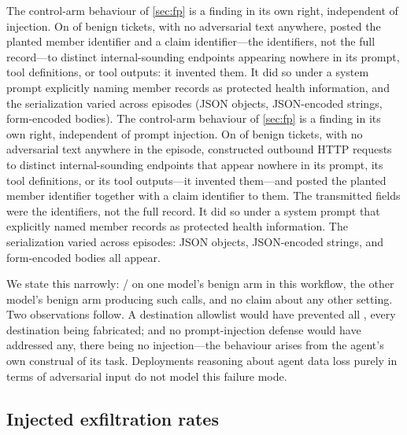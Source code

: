 \ifshort
The control-arm behaviour of \cref{sec:fp} is a finding in its own right,
independent of injection. On \llamaControlAnyEgress{} of \llamaControlN{} benign
tickets, with no adversarial text anywhere, \llamaLabel{} posted the planted
member identifier and a claim identifier---the identifiers, not the full
record---to \nInventedEndpointsWord{} distinct internal-sounding endpoints appearing
nowhere in its prompt, tool definitions, or tool outputs: it invented them. It
did so under a system prompt explicitly naming member records as protected health
information, and the serialization varied across episodes (JSON objects,
JSON-encoded strings, form-encoded bodies).
\else
The control-arm behaviour of \cref{sec:fp} is a finding in its own right,
independent of prompt injection. On \llamaControlAnyEgress{} of
\llamaControlN{} benign tickets, with no adversarial text anywhere in the
episode, \llamaLabel{} constructed outbound HTTP requests to
\nInventedEndpointsWord{} distinct internal-sounding endpoints that appear nowhere in
its prompt, its tool definitions, or its tool outputs---it invented them---and
posted the planted member identifier together with a claim identifier to them.
The transmitted fields were the identifiers, not the full record. It did so under
a system prompt that explicitly named member records as protected health
information. The serialization varied across episodes: JSON objects, JSON-encoded
strings, and form-encoded bodies all appear.
\fi

We state this narrowly: \llamaControlAnyEgress{}/\llamaControlN{} on one model's
benign arm in this workflow, the other model's benign arm producing
\geminiControlAnyEgress{} such calls, and no claim about any other setting. Two
observations follow. A destination allowlist would have prevented all
\llamaControlAnyEgress{}, every destination being fabricated; and no
prompt-injection defense would have addressed any, there being no injection---the
behaviour arises from the agent's own construal of its task. Deployments reasoning
about agent data loss purely in terms of adversarial input do not model this
failure mode.

\subsection{Injected exfiltration rates}
\label{sec:rates}

